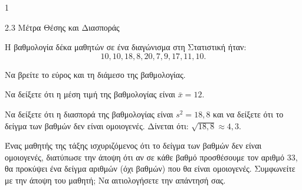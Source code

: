 \begin{ylh}{1}
	\item 2.3 Μέτρα Θέσης και Διασποράς
\end{ylh}
Η βαθμολογία δέκα μαθητών σε ένα διαγώνισμα στη Στατιστική ήταν:
\[ 10, 10, 18, 8, 20, 7, 9, 17, 11, 10. \]

\begin{alist}
	\item Να βρείτε το εύρος και τη διάμεσο της βαθμολογίας. 
	\item Να δείξετε ότι η μέση τιμή της βαθμολογίας είναι $\bar{x}=12$. 
	\item Να δείξετε ότι η διασπορά της βαθμολογίας είναι $s^2=18,8$ και να δείξετε ότι το δείγμα των βαθμών δεν είναι ομοιογενές. Δίνεται ότι: $\sqrt{18,8} \approx 4,3$. 
	\item Ένας μαθητής της τάξης ισχυριζόμενος ότι το δείγμα των βαθμών δεν είναι ομοιογενές, διατύπωσε την άποψη ότι αν σε κάθε βαθμό προσθέσουμε τον αριθμό 33, θα προκύψει ένα δείγμα αριθμών (όχι βαθμών) που θα είναι ομοιογενές. Συμφωνείτε με την άποψη του μαθητή; Να αιτιολογήσετε την απάντησή σας. 
\end{alist}

